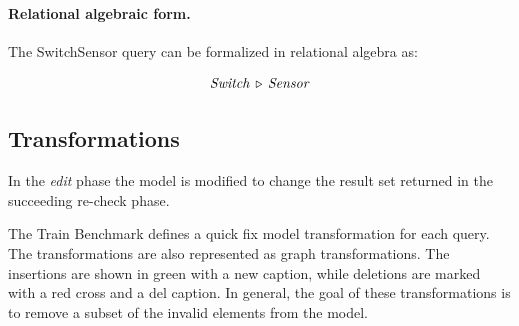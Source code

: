 \paragraph{Relational algebraic form.} The \textsf{SwitchSensor} query can be formalized in relational algebra as:

$$ \mathit{Switch} \, \triangleright \, \mathit{Sensor} $$


\subsection{Transformations}
\label{sec:transformatios}

In the \emph{edit} phase the model is modified to change the result set returned in the succeeding re-check phase.

The Train Benchmark defines a quick fix model transformation for each query. The transformations are also represented as graph transformations. The insertions are shown in green with a \guillemotleft{}new\guillemotright{} caption, while deletions are marked with a red cross and a \guillemotleft{}del\guillemotright{} caption. In general, the goal of these transformations is to remove a subset of the invalid elements from the model.

